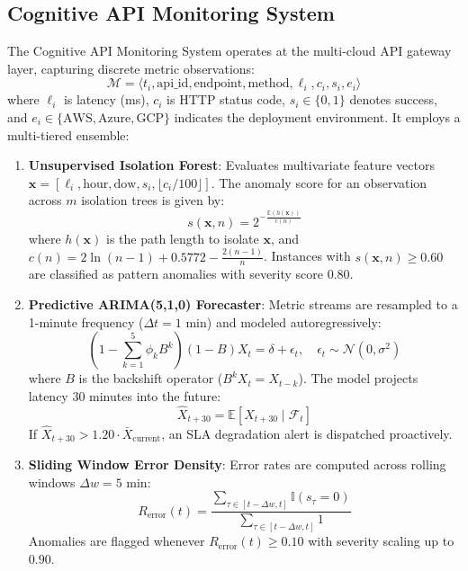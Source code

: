 \documentclass[11pt,a4paper]{article}
\begin{document}
\subsection{Cognitive API Monitoring System}
The Cognitive API Monitoring System operates at the multi-cloud API gateway layer, capturing discrete metric observations:
\begin{equation}
    \mathcal{M} = \langle t_i, \text{api\_id}, \text{endpoint}, \text{method}, \ell_i, c_i, s_i, e_i \rangle
\end{equation}
where $\ell_i$ is latency (ms), $c_i$ is HTTP status code, $s_i \in \{0, 1\}$ denotes success, and $e_i \in \{\text{AWS}, \text{Azure}, \text{GCP}\}$ indicates the deployment environment. It employs a multi-tiered ensemble:

\begin{enumerate}[leftmargin=*]
    \item \textbf{Unsupervised Isolation Forest}: Evaluates multivariate feature vectors $\mathbf{x} = [\ell_i, \text{hour}, \text{dow}, s_i, \lfloor c_i / 100 \rfloor]$. The anomaly score for an observation across $m$ isolation trees is given by:
    \begin{equation}
        s(\mathbf{x}, n) = 2^{-\frac{\mathbb{E}(h(\mathbf{x}))}{c(n)}}
    \end{equation}
    where $h(\mathbf{x})$ is the path length to isolate $\mathbf{x}$, and $c(n) = 2\ln(n - 1) + 0.5772 - \frac{2(n - 1)}{n}$. Instances with $s(\mathbf{x}, n) \ge 0.60$ are classified as pattern anomalies with severity score $0.80$.

    \item \textbf{Predictive ARIMA(5,1,0) Forecaster}: Metric streams are resampled to a 1-minute frequency ($\Delta t = 1\text{ min}$) and modeled autoregressively:
    \begin{equation}
        \left(1 - \sum_{k=1}^5 \phi_k B^k\right) (1 - B) X_t = \delta + \epsilon_t, \quad \epsilon_t \sim \mathcal{N}(0, \sigma^2)
    \end{equation}
    where $B$ is the backshift operator ($B^k X_t = X_{t-k}$). The model projects latency 30 minutes into the future:
    \begin{equation}
        \hat{X}_{t+30} = \mathbb{E}[X_{t+30} \mid \mathcal{F}_t]
    \end{equation}
    If $\hat{X}_{t+30} > 1.20 \cdot \bar{X}_{\text{current}}$, an SLA degradation alert is dispatched proactively.

    \item \textbf{Sliding Window Error Density}: Error rates are computed across rolling windows $\Delta w = 5\text{ min}$:
    \begin{equation}
        R_{\text{error}}(t) = \frac{\sum_{\tau \in [t - \Delta w, t]} \mathbb{I}(s_\tau = 0)}{\sum_{\tau \in [t - \Delta w, t]} 1}
    \end{equation}
    Anomalies are flagged whenever $R_{\text{error}}(t) \ge 0.10$ with severity scaling up to $0.90$.


\end{enumerate}
\end{document}
